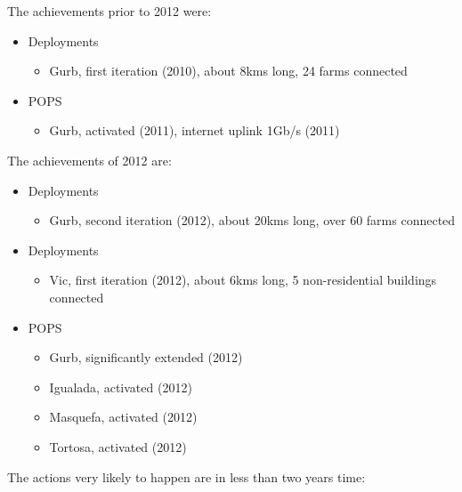 The achievements prior to 2012 were:

\begin{itemize}
  \item Deployments
    \begin{itemize}
      \item Gurb, first iteration (2010), about 8kms long, 24 farms connected
    \end{itemize}
  \item POPS
    \begin{itemize}
      \item Gurb, activated (2011), internet uplink 1Gb/s (2011)
    \end{itemize}
\end{itemize}

The achievements of 2012 are:

\begin{itemize}
  \item Deployments
    \begin{itemize}
      \item Gurb, second iteration (2012), about 20kms long, over 60 farms connected
    \end{itemize}
  \item Deployments
    \begin{itemize}
      \item Vic, first iteration (2012), about 6kms long, 5 non-residential buildings connected
    \end{itemize}
  \item POPS
    \begin{itemize}
      \item Gurb, significantly extended (2012)
    \end{itemize}
    \begin{itemize}
      \item Igualada, activated (2012)
    \end{itemize}    
    \begin{itemize}
      \item Masquefa, activated (2012)
    \end{itemize}
    \begin{itemize}
      \item Tortosa, activated (2012)
    \end{itemize}
\end{itemize}

The actions very likely to happen are in less than two years time:

